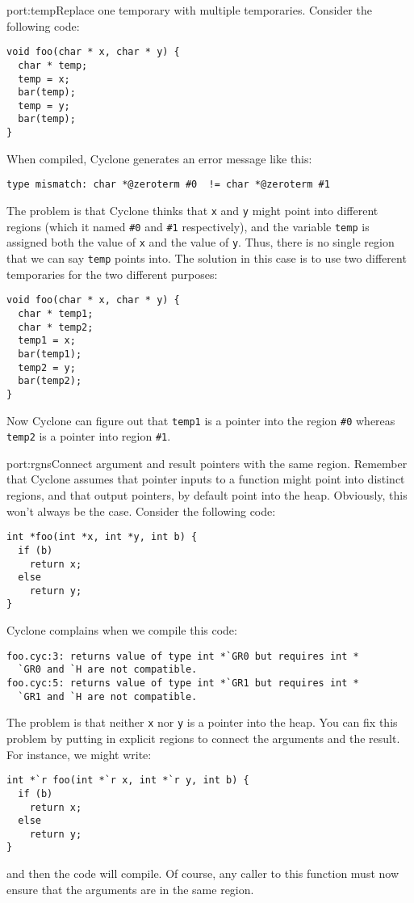 \begin{porta}{port:temp}{Replace one temporary with multiple temporaries.}
Consider the following code:
\begin{verbatim}
void foo(char * x, char * y) {
  char * temp;
  temp = x;
  bar(temp);
  temp = y;
  bar(temp);
}
\end{verbatim}

When compiled, Cyclone generates an error message like this:
\begin{verbatim}
type mismatch: char *@zeroterm #0  != char *@zeroterm #1 
\end{verbatim}

The problem is that Cyclone thinks that \texttt{x} and \texttt{y}
might point into different regions (which it named \texttt{\#0} and
\texttt{\#1} respectively), and the variable \texttt{temp} is assigned
both the value of \texttt{x} and the value of \texttt{y}.  Thus,
there is no single region that we can say \texttt{temp} points into.
The solution in this case is to use two different temporaries for
the two different purposes:
\begin{verbatim}
void foo(char * x, char * y) {
  char * temp1;
  char * temp2;
  temp1 = x;
  bar(temp1);
  temp2 = y;
  bar(temp2);
}
\end{verbatim}

Now Cyclone can figure out that \texttt{temp1} is a pointer into
the region \texttt{\#0} whereas \texttt{temp2} is a pointer into
region \texttt{\#1}.  
\end{porta}

\begin{porta}{port:rgns}{Connect argument and result pointers with the same region.}
Remember that Cyclone assumes that pointer inputs to a function might
point into distinct regions, and that output pointers, by default point
into the heap.  Obviously, this won't always be the case.  Consider
the following code:
\begin{verbatim}
int *foo(int *x, int *y, int b) {
  if (b)
    return x;
  else
    return y;
}
\end{verbatim}

Cyclone complains when we compile this code:
\begin{verbatim}
foo.cyc:3: returns value of type int *`GR0 but requires int *
  `GR0 and `H are not compatible. 
foo.cyc:5: returns value of type int *`GR1 but requires int *
  `GR1 and `H are not compatible. 
\end{verbatim}
The problem is that neither \texttt{x} nor \texttt{y} is a pointer
into the heap.  You can fix this problem by putting in explicit regions
to connect the arguments and the result.  For instance, we might write:
\begin{verbatim}
int *`r foo(int *`r x, int *`r y, int b) {
  if (b)
    return x;
  else
    return y;
}
\end{verbatim}
and then the code will compile.  Of course, any caller to this function
must now ensure that the arguments are in the same region.  
\end{porta}

